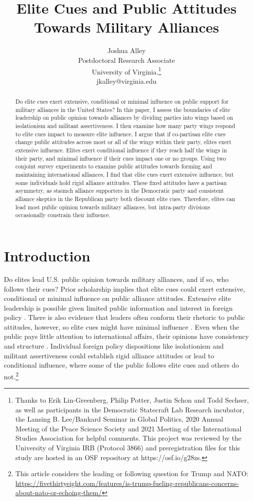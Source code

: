 \documentclass[12pt]{article}
\title{\textbf{Elite Cues and Public Attitudes Towards Military Alliances}}
\author{Joshua Alley \\
Postdoctoral Research Associate \\
University of Virginia.\thanks{Thanks to Erik Lin-Greenberg, Philip Potter, Justin Schon and Todd Sechser, as well as participants in the Democratic Statecraft Lab Research incubator, the Lansing B. Lee/Bankard Seminar in Global Politics, 2020 Annual Meeting of the Peace Science Society and 2021 Meeting of the International Studies Association for helpful comments. 
This project was reviewed by the University of Virginia IRB (Protocol 3866) and preregistration files for this study are hosted in an OSF repository at https://osf.io/g28zs.} \\
jkalley@virginia.edu
}
\date{}
\begin{document}
\maketitle 

\doublespace 

\begin{abstract}
Do elite cues exert extensive, conditional or minimal influence on public support for military alliances in the United States? 
In this paper, I assess the boundaries of elite leadership on public opinion towards alliances by dividing parties into wings based on isolationism and militant assertiveness.
I then examine how many party wings respond to elite cues impact to measure elite influence. 
I argue that if co-partisan elite cues change public attitudes across most or all of the wings within their party, elites exert extensive influence. 
Elites exert conditional influence if they reach half the wings in their party, and minimal influence if their cues impact one or no groups.
Using two conjoint survey experiments to examine public attitudes towards forming and maintaining international alliances, I find that elite cues exert extensive influence, but some individuals hold rigid alliance attitudes. 
These fixed attitudes have a partisan asymmetry, as staunch alliance supporters in the Democratic party and consistent alliance skeptics in the Republican party both discount elite cues.  
Therefore, elites can lead most public opinion towards military alliances, but intra-party divisions occasionally constrain their influence.  
\end{abstract}


\newpage 


\section{Introduction}


Do elites lead U.S. public opinion towards military alliances, and if so, who follows their cues?
Prior scholarship implies that elite cues could exert extensive, conditional or minimal influence on public alliance attitudes.
Extensive elite leadership is possible given limited public information and interest in foreign policy \citep{Canes-Wrone2006, BaumPotter2008, Druckman2014}.
There is also evidence that leaders often conform their rhetoric to public attitudes, however, so elite cues might have minimal influence \citep{Barberaetal2019, HagerHilbig2020}.
Even when the public pays little attention to international affairs, their opinions have consistency and structure \citep{Holsti1992, PageShapiro1992}.
Individual foreign policy dispositions like isolationism and militant assertiveness \citep{Herrmannetal1999, KertzerZeitzoff2017} could establish rigid alliance attitudes or lead to conditional influence, where some of the public follows elite cues and others do not.\footnote{This article considers the leading or following question for Trump and NATO: \url{https://fivethirtyeight.com/features/is-trump-fueling-republicans-concerns-about-nato-or-echoing-them/}}
\end{document}
